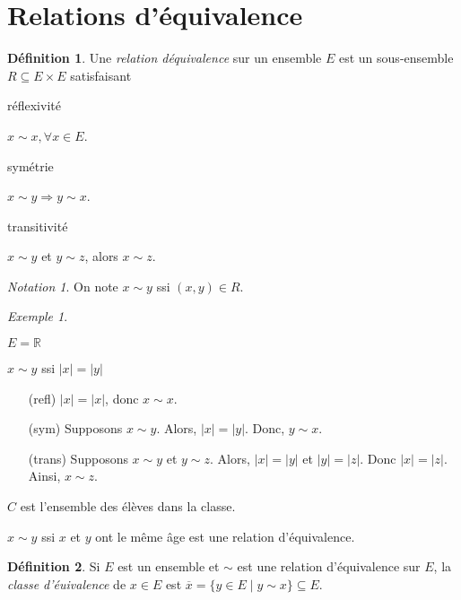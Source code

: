 \documentclass{report}
\newcommand*{\abs}[1]{\left| #1 \right|}
\newcommand*{\reels}{\mathbb{R}}
\theoremstyle{definition}
\newtheorem*{defin}{D\'efinition}
\theoremstyle{remark}
\newtheorem*{exem}{Exemple}
\newtheorem*{nota}{Notation}
\begin{document}
	\section{Relations d'\'equivalence}
	\begin{defin}
		Une \emph{relation d\'equivalence} sur un ensemble $E$ est un sous-ensemble $R \subseteq E \times E$ satisfaisant
		\begin{nlist}
			\item r\'eflexivit\'e

			$x \sim x, \forall x \in E$.
			\item sym\'etrie

			$x \sim y \Rightarrow y \sim x$.
			\item transitivit\'e

			$x \sim y$ et $y \sim z$, alors $x \sim z$.
		\end{nlist}
		\begin{nota}
			On note $x \sim y$ ssi $(x,y) \in R$.
		\end{nota}
	\end{defin}
	\begin{exem}~

		\begin{nlist}
			\item $E = \reels$

			$x \sim y$ ssi $\abs{x} = \abs{y}$
			\begin{itemize}
				\item[(refl)] $\abs{x} = \abs{x}$, donc $x \sim x$.
				\item[(sym)] Supposons $x \sim y$. Alors, $\abs{x} = \abs{y}$. Donc, $y \sim x$.
				\item[(trans)] Supposons $x \sim y$ et $y \sim z$. Alors, $\abs{x} = \abs{y}$ et $\abs{y} = \abs{z}$. Donc $\abs{x} = \abs{z}$. Ainsi, $x \sim z$.
			\end{itemize}
			\item $C$ est l'ensemble des \'el\`eves dans la classe.

			$x \sim y$ ssi $x$ et $y$ ont le m\^eme \^age est une relation d'\'equivalence.
		\end{nlist}
	\end{exem}
	\begin{defin}
		Si $E$ est un ensemble et $\sim$ est une relation d'\'equivalence sur $E$, la \emph{classe d'\'euivalence} de $x \in E$ est $\overline{x} = \{y \in E \mid y \sim x\} \subseteq E$.
	\end{defin}
\end{document}
